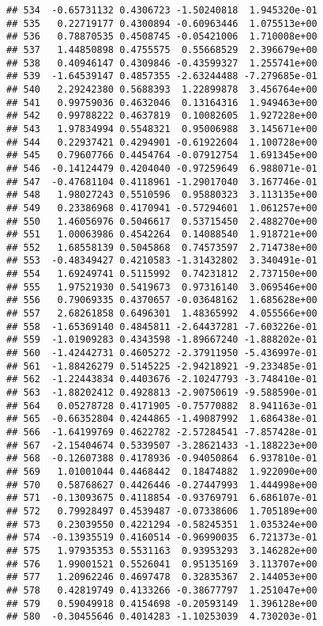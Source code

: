 \documentclass[
]{article}
\begin{document}
\begin{verbatim}
## 534  -0.65731132 0.4306723 -1.50240818  1.945320e-01
## 535   0.22719177 0.4300894 -0.60963446  1.075513e+00
## 536   0.78870535 0.4508745 -0.05421006  1.710008e+00
## 537   1.44850898 0.4755575  0.55668529  2.396679e+00
## 538   0.40946147 0.4309846 -0.43599327  1.255741e+00
## 539  -1.64539147 0.4857355 -2.63244488 -7.279685e-01
## 540   2.29242380 0.5688393  1.22899878  3.456764e+00
## 541   0.99759036 0.4632046  0.13164316  1.949463e+00
## 542   0.99788222 0.4637819  0.10082605  1.927228e+00
## 543   1.97834994 0.5548321  0.95006988  3.145671e+00
## 544   0.22937421 0.4294901 -0.61922604  1.100728e+00
## 545   0.79607766 0.4454764 -0.07912754  1.691345e+00
## 546  -0.14124479 0.4204040 -0.97259649  6.988071e-01
## 547  -0.47681104 0.4118961 -1.29017040  3.167746e-01
## 548   1.98027243 0.5510596  0.95880323  3.113135e+00
## 549   0.23386968 0.4170941 -0.57294601  1.061257e+00
## 550   1.46056976 0.5046617  0.53715450  2.488270e+00
## 551   1.00063986 0.4542264  0.14088540  1.918721e+00
## 552   1.68558139 0.5045868  0.74573597  2.714738e+00
## 553  -0.48349427 0.4210583 -1.31432802  3.340491e-01
## 554   1.69249741 0.5115992  0.74231812  2.737150e+00
## 555   1.97521930 0.5419673  0.97316140  3.069546e+00
## 556   0.79069335 0.4370657 -0.03648162  1.685628e+00
## 557   2.68261858 0.6496301  1.48365992  4.055566e+00
## 558  -1.65369140 0.4845811 -2.64437281 -7.603226e-01
## 559  -1.01909283 0.4343598 -1.89667240 -1.888202e-01
## 560  -1.42442731 0.4605272 -2.37911950 -5.436997e-01
## 561  -1.88426279 0.5145225 -2.94218921 -9.233485e-01
## 562  -1.22443834 0.4403676 -2.10247793 -3.748410e-01
## 563  -1.88202412 0.4928813 -2.90750619 -9.588590e-01
## 564   0.05278728 0.4171905 -0.75770882  8.941163e-01
## 565  -0.66352804 0.4244865 -1.49087992  1.686438e-01
## 566  -1.64199769 0.4622782 -2.57284541 -7.857428e-01
## 567  -2.15404674 0.5339507 -3.28621433 -1.188223e+00
## 568  -0.12607388 0.4178936 -0.94050864  6.937810e-01
## 569   1.01001044 0.4468442  0.18474882  1.922090e+00
## 570   0.58768627 0.4426446 -0.27447993  1.444998e+00
## 571  -0.13093675 0.4118854 -0.93769791  6.686107e-01
## 572   0.79928497 0.4539487 -0.07338606  1.705189e+00
## 573   0.23039550 0.4221294 -0.58245351  1.035324e+00
## 574  -0.13935519 0.4160514 -0.96990035  6.721373e-01
## 575   1.97935353 0.5531163  0.93953293  3.146282e+00
## 576   1.99001521 0.5526041  0.95135169  3.113707e+00
## 577   1.20962246 0.4697478  0.32835367  2.144053e+00
## 578   0.42819749 0.4133266 -0.38677797  1.251047e+00
## 579   0.59049918 0.4154698 -0.20593149  1.396128e+00
## 580  -0.30455646 0.4014283 -1.10253039  4.730203e-01

\end{verbatim}
\end{document}
